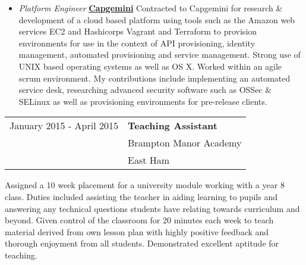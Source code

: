 \begin{itemize}
\item
	\indent \textit{Platform Engineer} \newline
	\indent \textbf{\underline{Capgemini}} \newline 
	Contracted to Capgemini for research \& development of a cloud based platform using tools such as the Amazon web services EC2 and Hashicorps Vagrant and Terraform to provision environments for use in the context of API provisioning, identity 			management, automated provisioning and service management.\newline \newline          
	Strong  use  of  UNIX  based  operating  systems  as well as OS X. Worked within an agile scrum environment. My contributions include  implementing  an  automated  service  desk, researching  advanced  security  software  such  as OSSec \& SELinux as well as provisioning environments for pre-release clients.
	\smallskip 
	\noindent 
\end{itemize}

\begin{flushright}
\begin{tabular}{r|l}
\indent January 2015 - April 2015 & \textbf{Teaching Assistant} \\
\indent & {\large{Brampton Manor Academy}} \\
\indent & East Ham
\end{tabular}
\end{flushright}

\noindent Assigned a 10 week placement for a university module working with a year 8 class. Duties included assisting the teacher in aiding learning to pupils and answering any technical questions students have relating towards curriculum and beyond. Given control of the classroom for 20 minutes each week to teach material derived from own lesson plan with highly positive feedback and thorough enjoyment from all students. Demonstrated excellent aptitude for teaching. \newline
